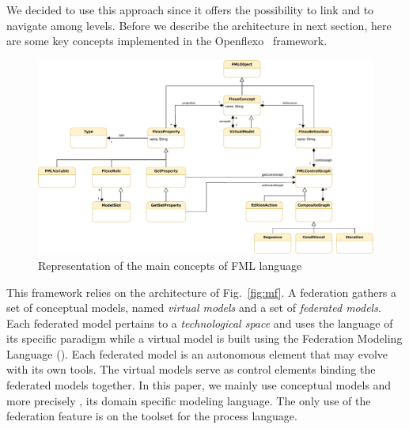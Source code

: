 We decided to use this approach since it offers the possibility to
link and to navigate among levels. Before we describe the 
architecture in next section, here are some key concepts implemented
in the Openflexo~\parencite{openflexo_link} framework.



\begin{figure}
    \centering
    \includegraphics[width=1.0 \textwidth]{Figures/FMLMetaModel-1.5.pdf}
    \caption{Representation of the main concepts of {FML} language}
    \label{fig:mm}
\end{figure}

This framework relies on the architecture of Fig.~\ref{fig:mf}. A federation
gathers a set of conceptual models, named \emph{virtual models} and a set of
\emph{federated models}. Each federated model pertains to a \emph{technological
space} and uses the language of its specific paradigm while a virtual model is
built using the Federation Modeling Language (\FML). Each federated model is an
autonomous element that may evolve with its own tools. The virtual models serve
as control elements binding the federated models together.  In this paper, we
mainly use conceptual models and more precisely \FML, its domain specific
modeling language. The only use of the federation feature is on the toolset for
the process language.

